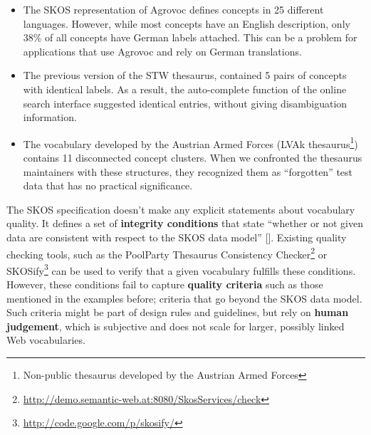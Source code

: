 \begin{itemize}

	\item The SKOS representation of Agrovoc defines concepts in 25 different languages. However, while most concepts have an English description, only 38\% of all concepts have German labels attached. This can be a problem for applications that use Agrovoc and rely on German translations.

	\item The previous version of the STW thesaurus, contained 5 pairs of concepts with identical labels. As a result, the auto-complete function of the online search interface suggested identical entries, without giving disambiguation information.


	\item The vocabulary developed by the Austrian Armed Forces (LVAk thesaurus\footnote{Non-public thesaurus developed by the Austrian Armed Forces}) contains 11 disconnected concept clusters. When we confronted the thesaurus maintainers with these structures, they recognized them as ``forgotten'' test data that has no practical significance.
	


\end{itemize}


The SKOS specification doesn't make any explicit statements about vocabulary quality. It defines a set of \textbf{integrity conditions} that state ``whether or not given data are consistent with respect to the SKOS data model'' []. Existing quality checking tools, such as the PoolParty Thesaurus Consistency Checker\footnote{\url{http://demo.semantic-web.at:8080/SkosServices/check}} or SKOSify\footnote{\url{http://code.google.com/p/skosify/}} can be used to verify that a given vocabulary fulfills these conditions. However, these conditions fail to capture \textbf{quality criteria} such as those mentioned in the examples before; criteria that go beyond the SKOS data model. Such criteria might be part of design rules and guidelines, but rely on \textbf{human judgement}, which is subjective and does not scale for larger, possibly linked Web vocabularies.

